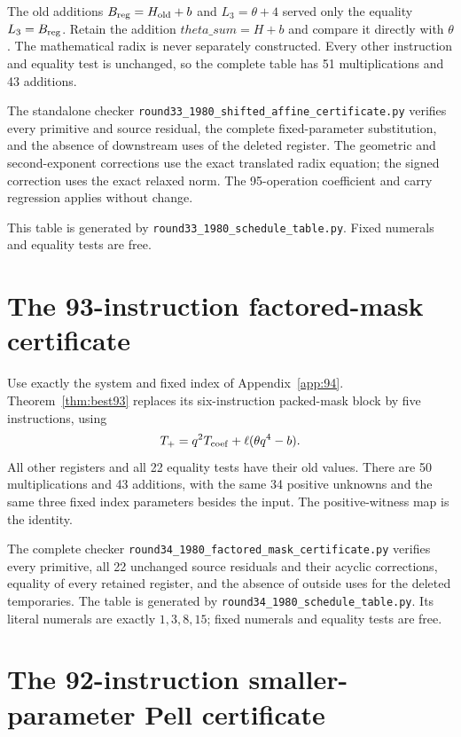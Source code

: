 \documentclass[11pt,letterpaper]{article}
\theoremstyle{definition}
\theoremstyle{remark}
\numberwithin{equation}{section}
\newcommand{\file}[1]{\texttt{#1}}
\begin{document}
The old additions $B_{\rm reg}=H_{\rm old}+b$ and $L_3=\theta+4$
served only the equality $L_3=B_{\rm reg}$. Retain the addition
$\mathit{theta\_sum}=H+b$ and compare it directly with $\theta$.
The mathematical radix is never separately constructed. Every other
instruction and equality test is unchanged, so the complete table
has 51 multiplications and 43 additions.

The standalone checker \file{round33\_1980\_shifted\_affine\_certificate.py}
verifies every primitive and source residual, the complete fixed-parameter
substitution, and the absence of downstream uses of the deleted register.
The geometric and second-exponent corrections use the exact translated
radix equation; the signed correction uses the exact relaxed norm.
The 95-operation coefficient and carry regression applies without change.

This table is generated by \file{round33\_1980\_schedule\_table.py}.
Fixed numerals and equality tests are free.

\small


\clearpage\normalsize
\section{The 93-instruction factored-mask certificate}\label{app:93}

Use exactly the system and fixed index of Appendix~\ref{app:94}.
Theorem~\ref{thm:best93} replaces its six-instruction packed-mask
block by five instructions, using
\[
 T_+=q^2T_{\rm coef}+\ell(\theta q^4-b).
\]
All other registers and all 22 equality tests have their old values.
There are 50 multiplications and 43 additions, with the same 34
positive unknowns and the same three fixed index parameters besides
the input. The positive-witness map is the identity.

The complete checker \file{round34\_1980\_factored\_mask\_certificate.py}
verifies every primitive, all 22 unchanged source residuals and their
acyclic corrections, equality of every retained register, and the
absence of outside uses for the deleted temporaries. The table is
generated by \file{round34\_1980\_schedule\_table.py}. Its literal
numerals are exactly $1,3,8,15$; fixed numerals and equality tests
are free.

\small


\clearpage\normalsize
\section{The 92-instruction smaller-parameter Pell certificate}\label{app:92}
\end{document}
